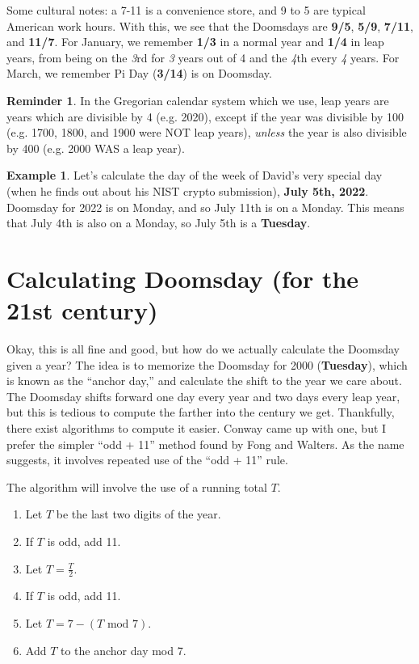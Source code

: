 \documentclass[12pt,letterpaper]{article}
\theoremstyle{plain}
\theoremstyle{definition}
\newtheorem{example}{Example}
\newtheorem*{reminder}{Reminder}
\begin{document}
Some cultural notes: a 7-11 is a convenience store, and 9 to 5 are typical American work hours. With this, we see that the Doomsdays are \textbf{9/5}, \textbf{5/9}, \textbf{7/11}, and \textbf{11/7}. For January, we remember \textbf{1/3} in a normal year and \textbf{1/4} in leap years, from being on the \textit 3rd for \textit{3} years out of 4 and the \textit 4th every \textit 4 years. For March, we remember Pi Day (\textbf{3/14}) is on Doomsday. 

\begin{reminder}\label{rem:leapyear}
	In the Gregorian calendar system which we use, leap years are years which are divisible by 4 (e.g. 2020), except if the year was divisible by 100 (e.g. 1700, 1800, and 1900 were NOT leap years), \textit{unless} the year is also divisible by 400 (e.g. 2000 WAS a leap year). 
\end{reminder}

\begin{example}
	Let's calculate the day of the week of David's very special day (when he finds out about his NIST crypto submission), \textbf{July 5th, 2022}. Doomsday for 2022 is on Monday, and so July 11th is on a Monday. This means that July 4th is also on a Monday, so July 5th is a \textbf{Tuesday}.
\end{example} 

\section{Calculating Doomsday (for the 21st century)}

Okay, this is all fine and good, but how do we actually calculate the Doomsday given a year? The idea is to memorize the Doomsday for 2000 (\textbf{Tuesday}), which is known as the ``anchor day,'' and calculate the shift to the year we care about. The Doomsday shifts forward one day every year and two days every leap year, but this is tedious to compute the farther into the century we get. Thankfully, there exist algorithms to compute it easier. Conway came up with one, but I prefer the simpler ``odd + 11'' method found by Fong and Walters. As the name suggests, it involves repeated use of the ``odd + 11'' rule. 

The algorithm will involve the use of a running total \(T\). 
\begin{enumerate}
	\item Let \(T\) be the last two digits of the year. 
	\item If \(T\) is odd, add 11. 
	\item Let \(T=\frac{T}{2}\). 
	\item If \(T\) is odd, add 11. 
	\item Let \(T=7-(T\text{ mod } 7)\). 
	\item Add \(T\) to the anchor day mod 7. 
\end{enumerate}
\end{document}
